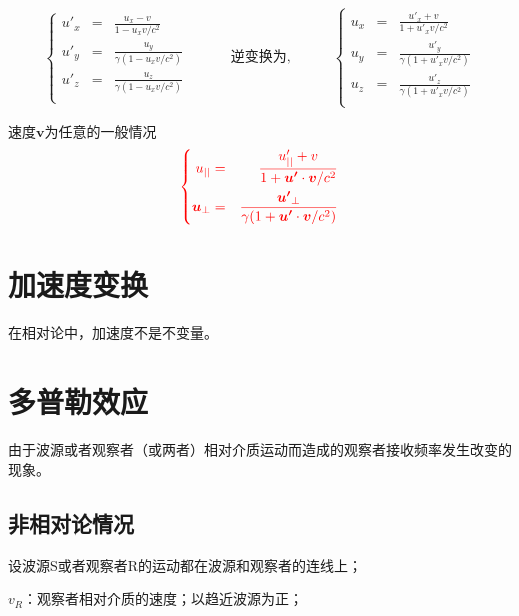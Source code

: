 \documentclass[12pt,a4paper]{article}
\renewcommand{\vec}[1]{\boldsymbol{#1}}
\begin{document}
\begin{equation}
\left\{
\begin{aligned}
{u'}_x &=& \frac{u_x -v}{1 -u_xv/c^2} \\
{u'}_y &=& \frac{u_y}{\gamma(1 -u_xv/c^2)} \\
{u'}_z &=& \frac{u_z}{\gamma(1 -u_xv/c^2)} \\
\end{aligned} \right.
\hspace{3em} \text{逆变换为,} \hspace{3em} 
\left\{
\begin{aligned}
{u}_x &=& \frac{{u'}_x +v}{1 +{u'}_xv/c^2} \\
{u}_y &=& \frac{{u'}_y}{\gamma(1 +{u'}_xv/c^2)} \\
{u}_z &=& \frac{{u'}_z}{\gamma(1 +{u'}_xv/c^2)} \\
\end{aligned} \right.
\end{equation}

速度$\vec{v}$为任意的一般情况
\begin{equation}
\color{red} \left\{
\begin{aligned}
{u}_{||} &=& \frac{{u'_{||}} +v}{1 +\vec{u'}\cdot \vec{v}/c^2} \\
\vec{u}_{\perp} &=& \frac{\vec{u'}_{\perp}}{\gamma(1 +\vec{u'}\cdot \vec{v}/c^2)}
\end{aligned} \right.
\end{equation}


\section{加速度变换}


在相对论中，加速度不是不变量。





\section{多普勒效应}
由于波源或者观察者（或两者）相对介质运动而造成的观察者接收频率发生改变的现象。

\subsection{非相对论情况}
设波源S或者观察者R的运动都在波源和观察者的连线上；

$v_R$：观察者相对介质的速度；以趋近波源为正；
\end{document}

